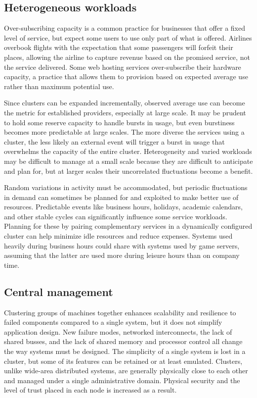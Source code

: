 \subsection{Heterogeneous workloads}

Over-subscribing capacity is a common practice for businesses that offer a fixed level of service, but expect some users to use only part of what is offered. Airlines overbook flights with the expectation that some passengers will forfeit their places, allowing the airline to capture revenue based on the promised service, not the service delivered. Some web hosting services over-subscribe their hardware capacity, a practice that allows them to provision based on expected average use rather than maximum potential use.

Since clusters can be expanded incrementally, observed average use can become the metric for established providers, especially at large scale. It may be prudent to hold some reserve capacity to handle bursts in usage, but even burstiness becomes more predictable at large scales. The more diverse the services using a cluster, the less likely an external event will trigger a burst in usage that overwhelms the capacity of the entire cluster. Heterogeneity and varied workloads may be difficult to manage at a small scale because they are difficult to anticipate and plan for, but at larger scales their uncorrelated fluctuations become a benefit.

Random variations in activity must be accommodated, but periodic fluctuations in demand can sometimes be planned for and exploited to make better use of resources. Predictable events like business hours, holidays, academic calendars, and other stable cycles can significantly influence some service workloads. Planning for these by pairing complementary services in a dynamically configured cluster can help minimize idle resources and reduce expenses. Systems used heavily during business hours could share with systems used by game servers, assuming that the latter are used more during leisure hours than on company time.

\subsection{Central management}

Clustering groups of machines together enhances scalability and resilience to failed components compared to a single system, but it does not simplify application design. New failure modes, networked interconnects, the lack of shared busses, and the lack of shared memory and processor control all change the way systems must be designed. The simplicity of a single system is lost in a cluster, but some of its features can be retained or at least emulated. Clusters, unlike wide-area distributed systems, are generally physically close to each other and managed under a single administrative domain. Physical security and the level of trust placed in each node is increased as a result.

